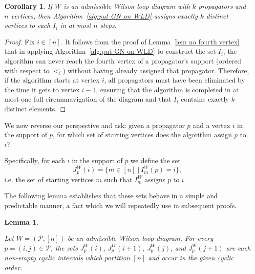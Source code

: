 \documentclass[11pt]{article}
\newcommand{\cP}{\mathcal{P}}
\newtheorem{lem}[thm]{Lemma}
\newtheorem{cor}[thm]{Corollary}
\theoremstyle{remark}
\theoremstyle{definition}
\begin{document}
\begin{cor}\label{GN alg well defined}
If $W$ is an admissible Wilson loop diagram with $k$ propagators and $n$ vertices, then Algorithm~\ref{alg:put GN on WLD} assigns exactly $k$ distinct vertices to each $I_i$ in at most $n$ steps.
\end{cor} 
\begin{proof}
Fix $i \in [n]$. It follows from the proof of Lemma~\ref{lem no fourth vertex} that in applying Algorithm~\ref{alg:put GN on WLD} to construct the set $I_i$, the algorithm can never reach the fourth vertex of a propagator's support (ordered with respect to $<_i$) without having already assigned that propagator. Therefore, if the algorithm starts at vertex $i$, all propagators must have been eliminated by the time it gets to vertex $i-1$, ensuring that the algorithm is completed in at most one full circumnavigation of the diagram and that $I_i$ contains exactly $k$ distinct elements.
\end{proof}

We now reverse our perspective and ask: given a propagator $p$ and a vertex $i$ in the support of $p$, for which set of starting vertices does the algorithm assign $p$ to $i$? 






Specifically, for each $i$ in the support of $p$ we define the set
\[J_p^{W}(i) = \{m \in [n] \ | \ I^{W}_m(p) = i \},\]
i.e. the set of starting vertices $m$ such that $I_m^{W}$ assigns $p$ to $i$. 

The following lemma establishes that these sets behave in a simple and predictable manner, a fact which we will repeatedly use in subsequent proofs.

\begingroup
\allowdisplaybreaks

\begin{lem} \label{vertex cyclic int lem}
  
Let $W = (\cP,[n])$ be an admissible Wilson loop diagram.  For every $p = (i,j) \in \cP$, the sets $J_p^{W}(i)$, $J_p^{W}(i+1)$, $J_p^{W}(j)$, and $J_p^{W}(j+1)$ are each non-empty cyclic intervals which partition $[n]$ and occur in the given cyclic order.
\end{lem}
\end{document}
